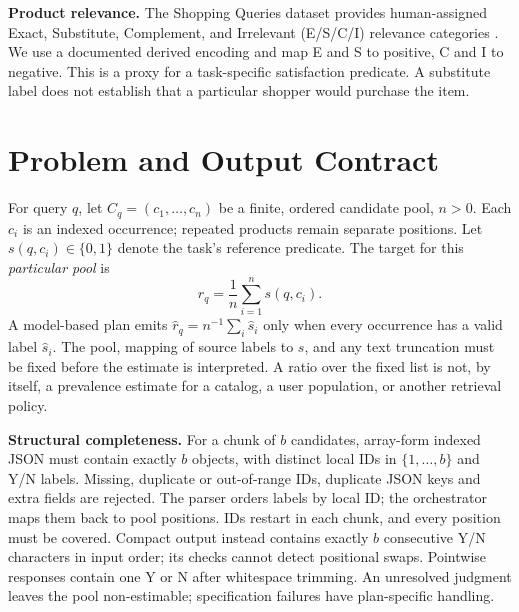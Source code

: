 \documentclass[conference]{IEEEtran}
\begin{document}
\textbf{Product relevance.} The Shopping Queries dataset provides human-assigned Exact, Substitute, Complement, and Irrelevant (E/S/C/I) relevance categories \cite{esci}. We use a documented derived encoding \cite{derived} and map E and S to positive, C and I to negative. This is a proxy for a task-specific satisfaction predicate. A substitute label does not establish that a particular shopper would purchase the item.

\section{Problem and Output Contract}
For query $q$, let $C_q=(c_1,\ldots,c_n)$ be a finite, ordered candidate pool, $n>0$. Each $c_i$ is an indexed occurrence; repeated products remain separate positions. Let $s(q,c_i)\in\{0,1\}$ denote the task's reference predicate. The target for this \emph{particular pool} is
\begin{equation}
r_q=\frac{1}{n}\sum_{i=1}^{n}s(q,c_i).
\end{equation}
A model-based plan emits $\hat{r}_q=n^{-1}\sum_i\hat{s}_i$ only when every occurrence has a valid label $\hat{s}_i$. The pool, mapping of source labels to $s$, and any text truncation must be fixed before the estimate is interpreted. A ratio over the fixed list is not, by itself, a prevalence estimate for a catalog, a user population, or another retrieval policy.

\textbf{Structural completeness.} For a chunk of $b$ candidates, array-form indexed JSON must contain exactly $b$ objects, with distinct local IDs in $\{1,\ldots,b\}$ and Y/N labels. Missing, duplicate or out-of-range IDs, duplicate JSON keys and extra fields are rejected. The parser orders labels by local ID; the orchestrator maps them back to pool positions. IDs restart in each chunk, and every position must be covered. Compact output instead contains exactly $b$ consecutive Y/N characters in input order; its checks cannot detect positional swaps. Pointwise responses contain one Y or N after whitespace trimming. An unresolved judgment leaves the pool non-estimable; specification failures have plan-specific handling.
\end{document}
